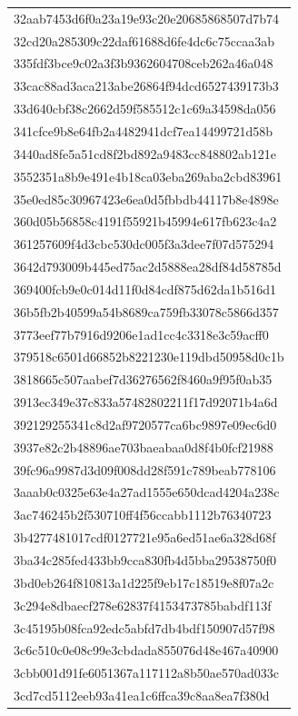 \begin{tabular}{l}
32aab7453d6f0a23a19e93c20e20685868507d7b74 \\
32cd20a285309c22daf61688d6fe4dc6c75ccaa3ab \\
335fdf3bce9c02a3f3b9362604708ceb262a46a048 \\
33cac88ad3aca213abe26864f94dcd6527439173b3 \\
33d640cbf38c2662d59f585512c1c69a34598da056 \\
341cfce9b8e64fb2a4482941dcf7ea14499721d58b \\
3440ad8fe5a51cd8f2bd892a9483cc848802ab121e \\
3552351a8b9e491e4b18ca03eba269aba2cbd83961 \\
35e0ed85c30967423e6ea0d5fbbdb44117b8e4898e \\
360d05b56858c4191f55921b45994e617fb623c4a2 \\
361257609f4d3cbc530dc005f3a3dee7f07d575294 \\
3642d793009b445ed75ac2d5888ea28df84d58785d \\
369400fcb9e0c014d11f0d84cdf875d62da1b516d1 \\
36b5fb2b40599a54b8689ca759fb33078c5866d357 \\
3773eef77b7916d9206e1ad1cc4c3318e3c59acff0 \\
379518c6501d66852b8221230e119dbd50958d0c1b \\
3818665c507aabef7d36276562f8460a9f95f0ab35 \\
3913ec349e37c833a57482802211f17d92071b4a6d \\
392129255341c8d2af9720577ca6bc9897e09ec6d0 \\
3937e82c2b48896ae703baeabaa0d8f4b0fcf21988 \\
39fc96a9987d3d09f008dd28f591c789beab778106 \\
3aaab0c0325e63e4a27ad1555e650dcad4204a238c \\
3ac746245b2f530710ff4f56ccabb1112b76340723 \\
3b4277481017cdf0127721e95a6ed51ae6a328d68f \\
3ba34c285fed433bb9cca830fb4d5bba29538750f0 \\
3bd0eb264f810813a1d225f9eb17c18519e8f07a2c \\
3c294e8dbaecf278e62837f4153473785babdf113f \\
3c45195b08fca92edc5abfd7db4bdf150907d57f98 \\
3c6c510c0e08c99e3cbdada855076d48e467a40900 \\
3cbb001d91fe6051367a117112a8b50ae570ad033c \\
3cd7cd5112eeb93a41ea1c6ffca39c8aa8ea7f380d \\

\end{tabular}
